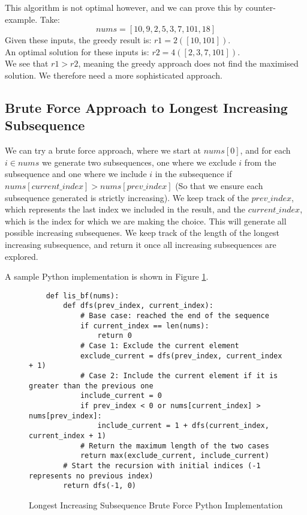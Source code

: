This algorithm is not optimal however, and we can prove this by counter-example.
Take:$$nums = [10,9,2,5,3,7,101,18]$$
Given these inputs, the greedy result is: $r1 = 2  ([10,101])$.\\
An optimal solution for these inputs is: $r2 = 4 ([2,3,7,101])$.\\
We see that $r1 > r2$, meaning the greedy approach does not find the maximised solution.
We therefore need a more sophisticated approach.

\subsection{Brute Force Approach to Longest Increasing Subsequence}

We can try a brute force approach, where we start at $nums[0]$, and for each $i \in nums$ we generate two subsequences,
one where we  exclude $i$ from the subsequence and one where we include $i$ in the subsequence if
$nums[current\_index] > nums[prev\_index]$ (So that we ensure each subsequence generated is strictly increasing).
We keep track of the $prev\_index$, which represents the last index we included in the result,
and the $current\_index$, which is the index for which we are making the choice.
This will generate all possible increasing subsequenes.
We keep track of the length of the longest increasing subsequence, and return it once all increasing subsequences are explored.

A sample Python implementation is shown in Figure \ref{fig:lis-bf}.

\begin{figure}[H]
    \centering
    \begin{lstlisting}
    def lis_bf(nums):
        def dfs(prev_index, current_index):
            # Base case: reached the end of the sequence
            if current_index == len(nums):
                return 0
            # Case 1: Exclude the current element
            exclude_current = dfs(prev_index, current_index + 1)
            # Case 2: Include the current element if it is greater than the previous one
            include_current = 0
            if prev_index < 0 or nums[current_index] > nums[prev_index]:
                include_current = 1 + dfs(current_index, current_index + 1)
            # Return the maximum length of the two cases
            return max(exclude_current, include_current)
        # Start the recursion with initial indices (-1 represents no previous index)
        return dfs(-1, 0)
    \end{lstlisting}
    \caption{Longest Increasing Subsequence Brute Force Python Implementation}
    \label{fig:lis-bf}
\end{figure}

